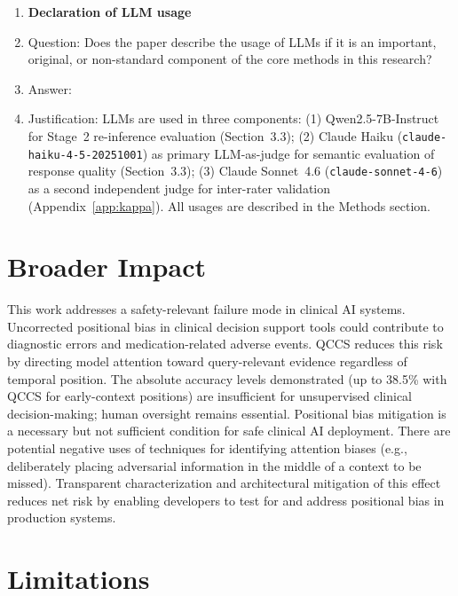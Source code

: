 \documentclass{article}
\begin{document}
\begin{enumerate}
\item {\bf Declaration of LLM usage}
  \item[] Question: Does the paper describe the usage of LLMs if it is an
    important, original, or non-standard component of the core methods in
    this research?
  \item[] Answer: \answerYes{}
  \item[] Justification: LLMs are used in three components: (1)
    Qwen2.5-7B-Instruct for Stage~2 re-inference evaluation (Section~3.3);
    (2) Claude Haiku (\texttt{claude-haiku-4-5-20251001}) as primary LLM-as-judge
    for semantic evaluation of response quality (Section~3.3);
    (3) Claude Sonnet~4.6 (\texttt{claude-sonnet-4-6}) as a second independent
    judge for inter-rater validation (Appendix~\ref{app:kappa}). All usages
    are described in the Methods section.

\end{enumerate}

\appendix

\section{Broader Impact}
\label{sec:broader}

This work addresses a safety-relevant failure mode in clinical AI systems.
Uncorrected positional bias in clinical decision support tools could contribute
to diagnostic errors and medication-related adverse events. QCCS reduces this
risk by directing model attention toward query-relevant evidence regardless of
temporal position. The absolute accuracy levels demonstrated (up to 38.5\% with
QCCS for early-context positions) are insufficient for unsupervised clinical
decision-making; human oversight remains essential. Positional bias mitigation
is a necessary but not sufficient condition for safe clinical AI deployment.
There are potential negative uses of techniques for identifying attention biases
(e.g., deliberately placing adversarial information in the middle of a context
to be missed). Transparent characterization and architectural mitigation of this
effect reduces net risk by enabling developers to test for and address positional
bias in production systems.

\section{Limitations}
\label{app:limitations}
\end{document}
